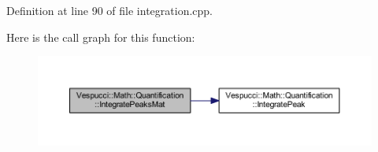 Definition at line 90 of file integration.\+cpp.



Here is the call graph for this function\+:
\nopagebreak
\begin{figure}[H]
\begin{center}
\leavevmode
\includegraphics[width=350pt]{namespace_vespucci_1_1_math_1_1_quantification_a69e656fff0fae8013961de06b6ff72cc_cgraph}
\end{center}
\end{figure}



